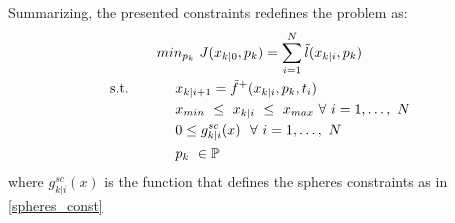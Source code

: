 Summarizing, the presented constraints redefines the problem as:
\begin{equation} 
	\begin{split}
			& min_{p_k}\ J({x}_{k|0},p_k) = \sum_{i=1}^{N}\tilde{l}({x}_{k|i},p_k) \\
			\textnormal{s.t.}\qquad
			&\ \ \ \ x_{k|i+1}=\tilde{f}^+(x_{k|i},p_k,t_i) \\
			&\ \ \ \ {x}_{min}\ \leq\ x_{k|i}\ \leq\ {x}_{max}\  \forall\ i=1,\dots,\ N  \\
			&\ \ \ \ 0 \leq g^{sc}_{k|i}(x)\ \ \forall\ i=1,\dots,\ N \\
			&\ \ \ \ p_k\   \in \mathbb{P}\ \\
	\end{split}	
	\label{ourproblem_param_vinc}
\end{equation}
where $g^{sc}_{k|i}(x)$ is the function that defines the spheres constraints as in \ref{spheres_const}

